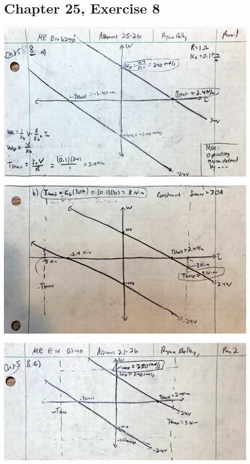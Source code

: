 \documentclass[12pt]{article}
\begin{document}
\section*{Chapter 25, Exercise 8}
\begin{center}
    
\includegraphics[width=5.2in]{25_8a.png}

\includegraphics[width=5.2in]{25_8b.png}

\includegraphics[width=5.2in]{25_8c.png}


\end{center}
\end{document}
